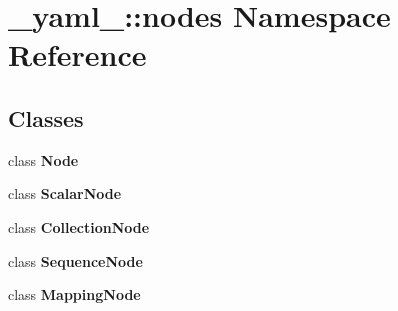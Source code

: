 \section{\_\-yaml\_\-::nodes Namespace Reference}
\label{namespace__yaml___1_1nodes}


\subsection*{Classes}
\begin{CompactItemize}
\item 
class {\bf Node}
\item 
class {\bf ScalarNode}
\item 
class {\bf CollectionNode}
\item 
class {\bf SequenceNode}
\item 
class {\bf MappingNode}
\end{CompactItemize}
